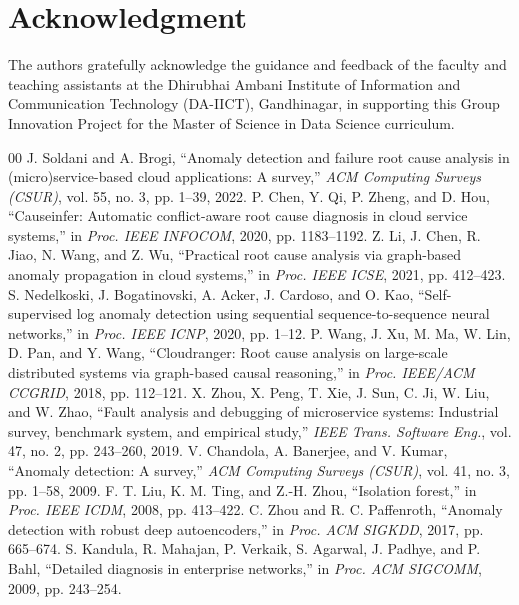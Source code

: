 \documentclass[conference]{IEEEtran}
\begin{document}
\section*{Acknowledgment}
The authors gratefully acknowledge the guidance and feedback of the faculty and teaching assistants at the Dhirubhai Ambani Institute of Information and Communication Technology (DA-IICT), Gandhinagar, in supporting this Group Innovation Project for the Master of Science in Data Science curriculum.

\begin{thebibliography}{00}
 J. Soldani and A. Brogi, ``Anomaly detection and failure root cause analysis in (micro)service-based cloud applications: A survey,'' \textit{ACM Computing Surveys (CSUR)}, vol. 55, no. 3, pp. 1--39, 2022.
 P. Chen, Y. Qi, P. Zheng, and D. Hou, ``Causeinfer: Automatic conflict-aware root cause diagnosis in cloud service systems,'' in \textit{Proc. IEEE INFOCOM}, 2020, pp. 1183--1192.
 Z. Li, J. Chen, R. Jiao, N. Wang, and Z. Wu, ``Practical root cause analysis via graph-based anomaly propagation in cloud systems,'' in \textit{Proc. IEEE ICSE}, 2021, pp. 412--423.
 S. Nedelkoski, J. Bogatinovski, A. Acker, J. Cardoso, and O. Kao, ``Self-supervised log anomaly detection using sequential sequence-to-sequence neural networks,'' in \textit{Proc. IEEE ICNP}, 2020, pp. 1--12.
 P. Wang, J. Xu, M. Ma, W. Lin, D. Pan, and Y. Wang, ``Cloudranger: Root cause analysis on large-scale distributed systems via graph-based causal reasoning,'' in \textit{Proc. IEEE/ACM CCGRID}, 2018, pp. 112--121.
 X. Zhou, X. Peng, T. Xie, J. Sun, C. Ji, W. Liu, and W. Zhao, ``Fault analysis and debugging of microservice systems: Industrial survey, benchmark system, and empirical study,'' \textit{IEEE Trans. Software Eng.}, vol. 47, no. 2, pp. 243--260, 2019.
 V. Chandola, A. Banerjee, and V. Kumar, ``Anomaly detection: A survey,'' \textit{ACM Computing Surveys (CSUR)}, vol. 41, no. 3, pp. 1--58, 2009.
 F. T. Liu, K. M. Ting, and Z.-H. Zhou, ``Isolation forest,'' in \textit{Proc. IEEE ICDM}, 2008, pp. 413--422.
 C. Zhou and R. C. Paffenroth, ``Anomaly detection with robust deep autoencoders,'' in \textit{Proc. ACM SIGKDD}, 2017, pp. 665--674.
 S. Kandula, R. Mahajan, P. Verkaik, S. Agarwal, J. Padhye, and P. Bahl, ``Detailed diagnosis in enterprise networks,'' in \textit{Proc. ACM SIGCOMM}, 2009, pp. 243--254.

\end{thebibliography}
\end{document}
